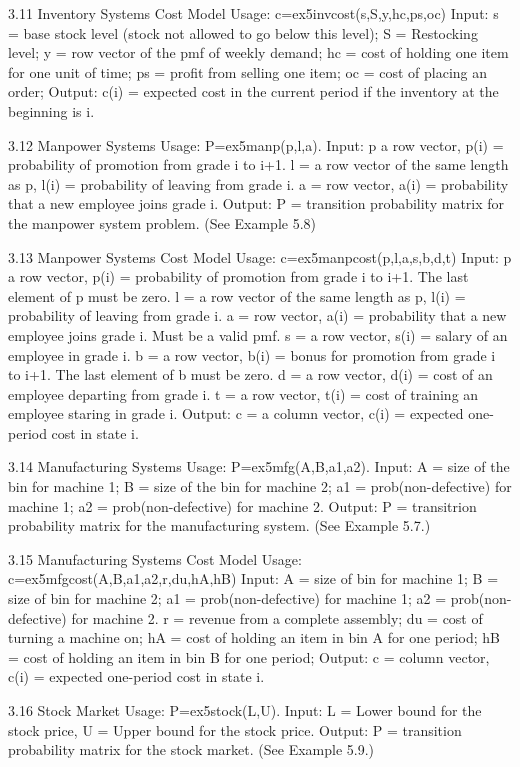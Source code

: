 3.11 Inventory Systems Cost Model
Usage:  c=ex5invcost(s,S,y,hc,ps,oc)
Input: s =  base stock level (stock not allowed to go below this level); 
S = Restocking level;
y = row vector of the pmf of weekly demand;
hc =  cost of holding one item for one unit of time;
ps =  profit from selling one item;
oc =  cost of placing an order;
Output: c(i) = expected cost in the current period if the inventory at the beginning is i.

3.12 Manpower Systems
Usage:  P=ex5manp(p,l,a).
Input: p a row vector, p(i) =  probability of promotion from grade i to i+1. 
l = a row vector of the same length as p,  l(i) =  probability of leaving from grade i.
a = row vector, a(i) = probability that a new employee joins grade i.
Output: P = transition  probability matrix for the manpower system problem. (See Example 5.8)

3.13 Manpower Systems Cost Model
Usage:  c=ex5manpcost(p,l,a,s,b,d,t)
Input: p a row vector, p(i) =  probability of promotion from grade i to 
i+1. The last element of p must be zero. 
l = a row vector of the same length as p, l(i) =  probability of leaving 
from grade i.
a = row vector, a(i) = probability that a new employee joins grade i. Must be a valid pmf.
s = a row vector, s(i) = salary of an employee in grade i.
b = a row vector, b(i) = bonus for promotion from grade i to i+1. The last element of b must be zero.
d =  a row vector, d(i) = cost of an employee departing from grade i.
t = a row vector, t(i) = cost of training an employee staring in grade i.
Output: c = a column vector, c(i) = expected one-period cost in state i. 

3.14 Manufacturing Systems
Usage:  P=ex5mfg(A,B,a1,a2).
Input: A = size of the bin for machine 1;
B = size of the bin for machine 2;
a1 = prob(non-defective) for machine 1;
a2 = prob(non-defective) for machine 2.
Output: P = transitrion probability matrix for the manufacturing system. (See Example 5.7.)

3.15 Manufacturing Systems Cost Model
Usage:  c=ex5mfgcost(A,B,a1,a2,r,du,hA,hB)
Input: A = size of bin for machine 1;
B = size of bin for machine 2;
a1 = prob(non-defective) for machine 1;
a2 = prob(non-defective) for machine 2.
r =  revenue from a complete assembly;
du = cost of turning a machine on;
hA = cost of holding an item in bin A for one period;
hB = cost of holding an item in bin B for one period;
Output: c = column vector, c(i) = expected one-period cost in state i.
 
3.16 Stock Market
Usage:  P=ex5stock(L,U).
Input: L = Lower bound for the stock price,
U = Upper bound for the stock price.
Output: P = transition  probability matrix for the stock market. (See Example 5.9.)

